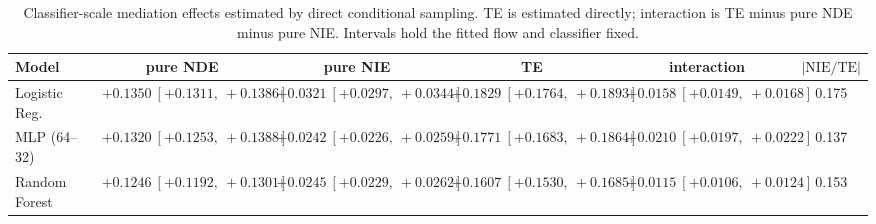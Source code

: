 \begin{table}[htbp]
  \centering
  \caption{Classifier-scale mediation effects estimated by direct conditional sampling. TE is estimated directly; interaction is TE minus pure NDE minus pure NIE. Intervals hold the fitted flow and classifier fixed.}
  \label{tab:adult_gap_overall}
  \begin{tabular}{lccccc}
    \toprule
    Model & pure NDE & pure NIE & TE & interaction & $|\mathrm{NIE}/\mathrm{TE}|$ \\
    \midrule
    Logistic Reg. & $+0.1350\ [+0.1311,\ +0.1386]$ & $+0.0321\ [+0.0297,\ +0.0344]$ & $+0.1829\ [+0.1764,\ +0.1893]$ & $+0.0158\ [+0.0149,\ +0.0168]$ & 0.175 \\
    MLP (64--32) & $+0.1320\ [+0.1253,\ +0.1388]$ & $+0.0242\ [+0.0226,\ +0.0259]$ & $+0.1771\ [+0.1683,\ +0.1864]$ & $+0.0210\ [+0.0197,\ +0.0222]$ & 0.137 \\
    Random Forest & $+0.1246\ [+0.1192,\ +0.1301]$ & $+0.0245\ [+0.0229,\ +0.0262]$ & $+0.1607\ [+0.1530,\ +0.1685]$ & $+0.0115\ [+0.0106,\ +0.0124]$ & 0.153 \\
    \bottomrule
  \end{tabular}
\end{table}